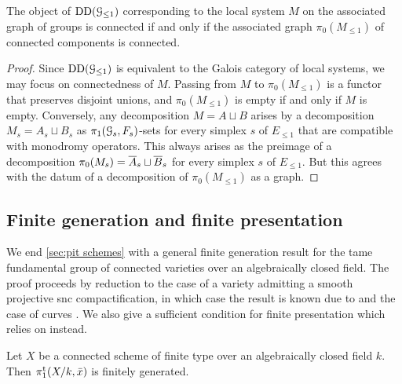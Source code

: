 \begin{lem} \label{lem:local-system-connected}
    The object of $\operatorname{DD}({\mathcal G}_{\leq 1})$ corresponding to the local system $M$ on the associated graph of groups is connected if and only if the associated graph $\pi_0(M_{\leq 1})$ of connected components is connected.
\end{lem}

\begin{proof}
    Since $\operatorname{DD}({\mathcal G}_{\leq 1})$ is equivalent to the Galois category of local systems, we may focus on connectedness of $M$. 
    Passing from $M$ to $\pi_0(M_{\leq 1})$ is a functor that preserves disjoint unions, and $\pi_0(M_{\leq 1})$ is empty if and only if $M$ is empty. Conversely, any decomposition $M = A \sqcup B$ arises by a decomposition $M_s = A_s \sqcup B_s$ as $\pi_1({\mathcal G}_s,F_s)$-sets for every simplex $s$ of $E_{\leq 1}$ that are compatible with monodromy operators.  
    This always arises as the preimage of a decomposition $\pi_0(M_s) = \overline{A}_s \sqcup \overline{B}_s$ for every simplex $s$ of $E_{\leq 1}$. 
    But this agrees with the datum of a decomposition of 
    $\pi_0(M_{\leq 1})$ as a graph.
\end{proof}


\subsection{Finite generation and finite presentation}

We end \cref{sec:pit schemes} with a general finite generation result for the tame fundamental group of connected varieties over an algebraically closed field. The proof proceeds by reduction to the case of a variety admitting a smooth projective snc compactification, in which case the result is known due to \cite[Theorem~1.1]{EsnaultKindler2016:LefschetzTheoremsTamely} and the case of curves \cite[XIII, Corollaire 2.12]{SGA1}.
We also give a sufficient condition for finite presentation which relies on \cite[Theorem~1.1]{EsnaultShustermanSrinivas2022:FinitePresentationTame} instead. 

\begin{thm} \label{thm:naked pi1tame fg}
    Let $X$ be a connected scheme of finite type over an algebraically closed field $k$. Then $\pi_1^{\mathrm{t}}(X/k,\bar x)$ is finitely generated. 
\end{thm}

